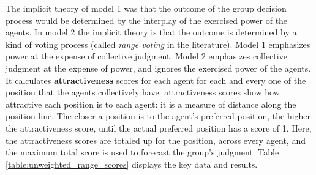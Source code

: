 The implicit theory of model 1 was that the outcome of the group decision process would be determined by the interplay of the   {exercised power} of the agents. In model 2 the implicit theory is that the outcome is determined by a kind of voting process (called \emph{range voting} in the literature). Model 1 emphasizes power at the expense of collective judgment. Model 2 emphasizes collective judgment at the expense of power, and  ignores the   {exercised power} of the agents. It calculates  {\bf  {attractiveness}} scores for each agent for each and every one of the   {position} that the agents collectively have. %
  {attractiveness} scores show how attractive each   {position} is to each agent: it is a measure of distance along the position line. The closer a position is to the agent's preferred position, the higher the   {attractiveness} score, until the actual preferred position has a score of 1.
Here, the   {attractiveness} scores are totaled up for the   {position}, across every agent, and  the maximum total score is used to forecast  the group's judgment. 
%
Table \ref{table:unweighted_range_scores} displays the key data and results.

 


